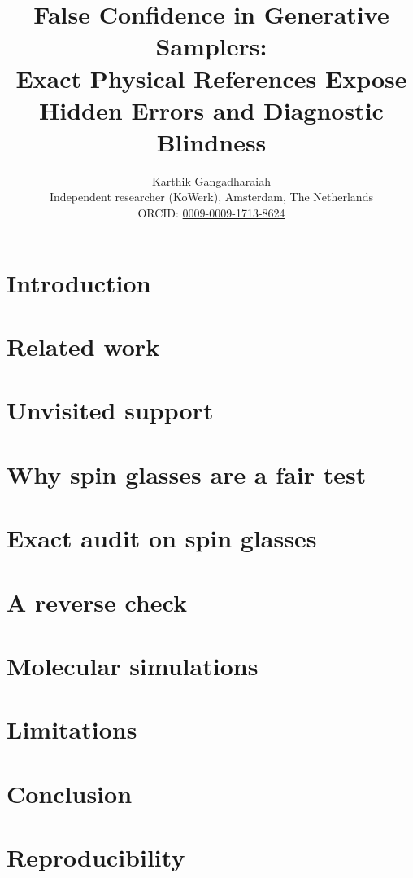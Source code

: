 \documentclass[10pt]{article}
\title{False Confidence in Generative Samplers:\\Exact Physical References Expose Hidden Errors and Diagnostic Blindness}
\author{\name Karthik Gangadharaiah \\
      \addr Independent researcher (KoWerk), Amsterdam, The Netherlands \\
      ORCID: \href{https://orcid.org/0009-0009-1713-8624}{0009-0009-1713-8624}}
\begin{document}
\maketitle

\begin{abstract}

\end{abstract}

\section{Introduction}
\label{sec:intro}


\section{Related work}
\label{sec:related}


\section{Unvisited support}
\label{sec:theory}


\section{Why spin glasses are a fair test}
\label{sec:isomorphism}


\section{Exact audit on spin glasses}
\label{sec:benchmarks}


\section{A reverse check}
\label{sec:bidirectional}


\section{Molecular simulations}
\label{sec:molecular_case}


\section{Limitations}
\label{sec:limitations}


\section{Conclusion}
\label{sec:conclusion}


\section*{Reproducibility}
\label{sec:repro}




\end{document}
